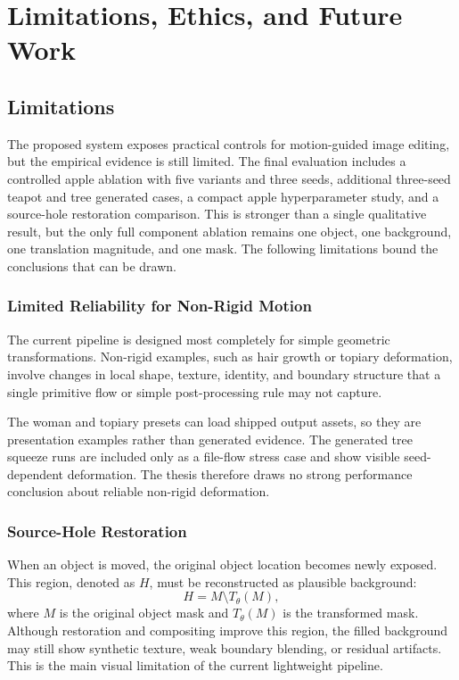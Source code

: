 \setlength{\footskip}{8mm}

\chapter{Limitations, Ethics, and Future Work}
\label{ch:limitations}

\section{Limitations}

The proposed system exposes practical controls for motion-guided image editing, but the empirical evidence is still limited. The final evaluation includes a controlled apple ablation with five variants and three seeds, additional three-seed teapot and tree generated cases, a compact apple hyperparameter study, and a source-hole restoration comparison. This is stronger than a single qualitative result, but the only full component ablation remains one object, one background, one translation magnitude, and one mask. The following limitations bound the conclusions that can be drawn.

\subsection{Limited Reliability for Non-Rigid Motion}

The current pipeline is designed most completely for simple geometric transformations. Non-rigid examples, such as hair growth or topiary deformation, involve changes in local shape, texture, identity, and boundary structure that a single primitive flow or simple post-processing rule may not capture.

The woman and topiary presets can load shipped output assets, so they are presentation examples rather than generated evidence. The generated tree squeeze runs are included only as a file-flow stress case and show visible seed-dependent deformation. The thesis therefore draws no strong performance conclusion about reliable non-rigid deformation.

\subsection{Source-Hole Restoration}

When an object is moved, the original object location becomes newly exposed. This region, denoted as $H$, must be reconstructed as plausible background:
\begin{equation}
  H = M \setminus T_\theta(M),
\end{equation}
where $M$ is the original object mask and $T_\theta(M)$ is the transformed mask. Although restoration and compositing improve this region, the filled background may still show synthetic texture, weak boundary blending, or residual artifacts. This is the main visual limitation of the current lightweight pipeline.

